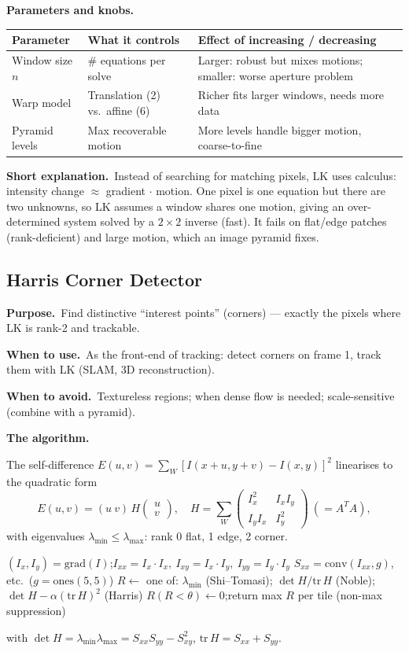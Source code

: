 \documentclass[10pt]{article}
\makeatletter
\newcommand{\Purpose}{\par\smallskip\textbf{Purpose.}\ }
\newcommand{\WhenUse}{\par\textbf{When to use.}\ }
\newcommand{\WhenAvoid}{\par\textbf{When to avoid.}\ }
\newcommand{\TheAlgo}{\par\smallskip\textbf{The algorithm.}\par\nopagebreak}
\newcommand{\Knobs}{\par\smallskip\textbf{Parameters and knobs.}\par\nopagebreak}
\newcommand{\ShortExp}{\par\smallskip\textbf{Short explanation.}\ }
\newcommand{\Ix}{I_x}\newcommand{\Iy}{I_y}\newcommand{\It}{I_t}
\newenvironment{ptable}{\begin{center}\small\begin{tabular}{@{}p{2.5cm} p{5.9cm} p{6.2cm}@{}}\toprule
Parameter & What it controls & Effect of increasing / decreasing \\ \midrule}
{\bottomrule\end{tabular}\end{center}}
\makeatother
\begin{document}
\Knobs
\begin{ptable}
Window size $n$ & \# equations per solve & Larger: robust but mixes motions; smaller: worse aperture problem \\
Warp model & Translation (2) vs.\ affine (6) & Richer fits larger windows, needs more data \\
Pyramid levels & Max recoverable motion & More levels handle bigger motion, coarse-to-fine \\
\end{ptable}
\ShortExp Instead of searching for matching pixels, LK uses calculus: intensity change $\approx$
gradient $\cdot$ motion. One pixel is one equation but there are two unknowns, so LK assumes a window shares
one motion, giving an over-determined system solved by a $2\times2$ inverse (fast). It fails on flat/edge
patches (rank-deficient) and large motion, which an image pyramid fixes.

\subsection{Harris Corner Detector}\label{sub:harris}
\Purpose Find distinctive ``interest points'' (corners) --- exactly the pixels where LK is rank-2 and
trackable.
\WhenUse As the front-end of tracking: detect corners on frame 1, track them with LK (SLAM, 3D
reconstruction).
\WhenAvoid Textureless regions; when dense flow is needed; scale-sensitive (combine with a pyramid).
\TheAlgo The self-difference $E(u,v)=\sum_W[I(x{+}u,y{+}v)-I(x,y)]^2$ linearises to the quadratic form
\[
E(u,v)=(u\ v)\,H\begin{pmatrix}u\\v\end{pmatrix},\quad
H=\sum_{W}\begin{pmatrix}\Ix^2&\Ix\Iy\\ \Iy\Ix&\Iy^2\end{pmatrix}\ (=A^TA),
\]
with eigenvalues $\lambda_{\min}\le\lambda_{\max}$: rank 0 flat, 1 edge, 2 corner.

\begin{algorithm}[H]
\SetAlgoLined
{}
$(\Ix,\Iy)=\mathrm{grad}(I)$;\quad $I_{xx}=\Ix\!\cdot\!\Ix,\ I_{xy}=\Ix\!\cdot\!\Iy,\ I_{yy}=\Iy\!\cdot\!\Iy$\;
$S_{xx}=\mathrm{conv}(I_{xx},g)$, etc.\ ($g=\mathrm{ones}(5,5)$)\;
$R\leftarrow$ one of: $\lambda_{\min}$ (Shi--Tomasi); $\det H/\mathrm{tr}\,H$ (Noble);
$\det H-\alpha(\mathrm{tr}\,H)^2$ (Harris)\;
$R(R<\theta)\leftarrow0$;\quad return max $R$ per tile (non-max suppression)\;
\caption{Harris / structure-tensor detection}
\end{algorithm}
with $\det H=\lambda_{\min}\lambda_{\max}=S_{xx}S_{yy}-S_{xy}^2$, $\mathrm{tr}\,H=S_{xx}+S_{yy}$.
\end{document}
